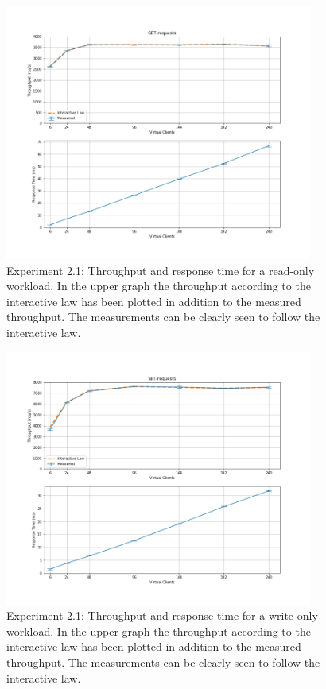 \documentclass[11pt,a4paper]{article}
\begin{document}
\begin{figure}[h]
\centering
\includegraphics[width=0.9\textwidth]{21/21_get_requests}
\caption{Experiment 2.1: Throughput and response time for a read-only workload. In the upper graph the throughput according to the interactive law has been plotted in addition to the measured throughput. The measurements can be clearly seen to follow the interactive law.}
\label{fig:21get}
\end{figure}

\begin{figure}[h]
\centering
\includegraphics[width=0.9\textwidth]{21/21_set_requests}
\caption{Experiment 2.1: Throughput and response time for a write-only workload. In the upper graph the throughput according to the interactive law has been plotted in addition to the measured throughput. The measurements can be clearly seen to follow the interactive law.}
\label{fig:21set}
\end{figure}
\end{document}
